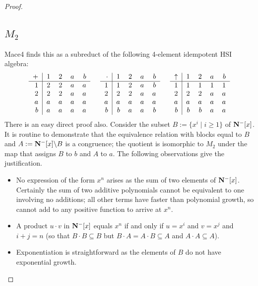 \documentclass[eqnor,reqno]{amsart}
\theoremstyle{plain}
\theoremstyle{definition}
\begin{document}
\begin{proof}
\subsection{$M_2$} Mace4 finds this as a subreduct of the following 4-element idempotent HSI algebra:
\[
\begin{tabular}{r|rrrr}
$+$ &  1 & 2 & $a$ & $b$ \\
\hline
    1 &  2 & 2 & $a$ & $a$ \\
    2 & 2 & 2 & $a$ & $a$ \\
    $a$ & $a$ & $a$ & $a$ & $a$ \\
    $b$ & $a$ & $a$ & $a$ & $a$ 
\end{tabular} \hspace{.5cm}
\begin{tabular}{r|rrrr}
$\cdot$ & 1 & 2 & $a$ & $b$ \\
\hline
    1  & 1 & 2 & $a$ & $b$\\
    2 & 2 & 2 & $a$ & $a$ \\
    $a$ & $a$ & $a$ & $a$ & $a$ \\
    $b$ & $b$ & $a$ & $a$&  $b$ 
\end{tabular} \hspace{.5cm}
\begin{tabular}{r|rrrr}
$\uparrow$ & 1 & 2 & $a$ & $b$ \\
\hline
    1 & 1 & 1 & 1 & 1 \\
    2 & 2 & 2 & $a$ & $a$ \\
    $a$ & $a$ & $a$ & $a$ & $a$ \\
    $b$ & $b$ & $b$ & $a$ & $a$ 
\end{tabular}
\]
There is an easy direct proof also.
Consider the subset $B:=\{x^i\mid i\geq 1\}$ of ${\bf N}^-[x]$.  It is routine to demonstrate that the equivalence relation with blocks equal to $B$ and $A:={\bf N}^-[x]\backslash B$ is a congruence; the quotient is isomorphic to $M_2$ under the map that assigns $B$ to $b$ and $A$ to $a$.  The following observations give the justification.
\begin{itemize}
\item No expression of the form $x^n$ arises as the sum of two elements of ${\bf N}^-[x]$.  
Certainly the sum of two additive polynomials cannot be equivalent to one involving no additions; all other terms have faster than polynomial growth, so cannot add to any positive function to arrive at $x^n$.
\item A product $u\cdot v$ in ${\bf N}^-[x]$ equals $x^n$ if and only if $u=x^{i}$ and $v=x^j$ and $i+j=n$ (so that $B\cdot B\subseteq B$ but $B\cdot A=A\cdot B\subseteq A$ and $A\cdot A\subseteq A$). 
\item Exponentiation is straightforward as the elements of $B$ do not have exponential growth. 
\end{itemize}



\end{proof}
\end{document}
